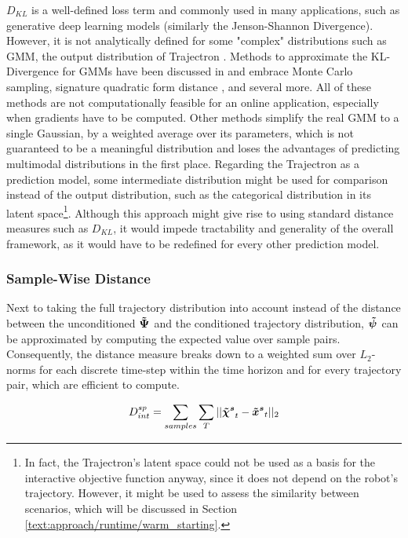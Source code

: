 $D_{KL}$ is a well-defined loss term and commonly used in many applications, such as generative deep learning models \cite{Goodfellow2014}\cite{Salzmann2020} (similarly the Jenson-Shannon Divergence). However, it is not analytically defined for some "complex" distributions such as \ac{GMM}, the output distribution of Trajectron \cite{Ivanovic2018}. Methods to approximate the KL-Divergence for \ac{GMM}s have been discussed in \cite{Cui2015} and embrace Monte Carlo sampling, signature quadratic form distance \cite{Beecks2011}, and several more. All of these methods are not computationally feasible for an online application, especially when gradients have to be computed. Other methods simplify the real \ac{GMM} to a single Gaussian, by a weighted average over its parameters, which is not guaranteed to be a meaningful distribution and loses the advantages of predicting multimodal distributions in the first place.
\newline
Regarding the Trajectron \cite{Ivanovic2018} as a prediction model, some intermediate distribution might be used for comparison instead of the output distribution, such as the categorical distribution in its latent space\footnote{In fact, the Trajectron's latent space could not be used as a basis for the interactive objective function anyway, since it does not depend on the robot's trajectory. However, it might be used to assess the similarity between scenarios, which will be discussed in Section \ref{text:approach/runtime/warm_starting}.}. Although this approach might give rise to using standard distance measures such as $D_{KL}$, it would impede tractability and generality of the overall framework, as it would have to be redefined for every other prediction model.

\subsubsection{Sample-Wise Distance}
Next to taking the full trajectory distribution into account instead of the distance between the unconditioned $\distwo[]$ and the conditioned trajectory distribution, $\dist[]$ can be approximated by computing the expected value over sample pairs. Consequently, the distance measure breaks down to a weighted sum over $L_2$-norms for each discrete time-step within the time horizon and for every trajectory pair, which are efficient to compute.

\begin{equation}
D_{int}^{sp} = \sum_{samples} \sum_T ||\xpedwo[s]_t - \xped[s]_t||_2
\end{equation}

